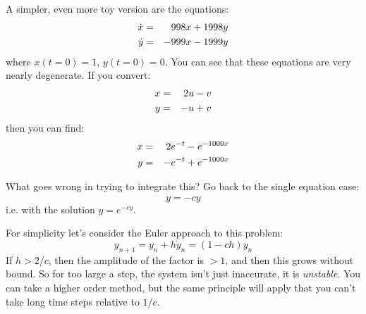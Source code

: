 A simpler, even more toy version are the equations:
\begin{eqnarray}
{\dot x} &=& 998 x + 1998 y \cr
{\dot y} &=& -999 x - 1999 y 
\end{eqnarray}
where $x(t=0)=1$, $y(t=0)=0$.  You can see that these equations are
very nearly degenerate. If you convert:
\begin{eqnarray}
  x &=& 2u -v \cr
  y &=& -u + v
\end{eqnarray}
then you can find:
\begin{eqnarray}
   x &=& 2 e^{-t} - e^{-1000x} \cr
   y &=& - e^{-t} + e^{-1000x} \cr
\end{eqnarray}

What goes wrong in trying to integrate this? Go back to the single
equation case:
\begin{equation}
 {\dot y} = - c y
\end{equation}
i.e. with the solution $y=e^{-cy}$.

For simplicity let's consider the Euler approach to this problem:
\begin{equation}
y_{n+1} = y_n + h {\dot y}_n = (1-ch) y_n
\end{equation}
If $h>2/c$, then the amplitude of the factor is $>1$, and then this
grows without bound. So for too large a step, the system isn't just
inaccurate, it is {\it unstable}. You can take a higher order method,
but the same principle will apply that you can't take long time steps
relative to $1/c$. 



